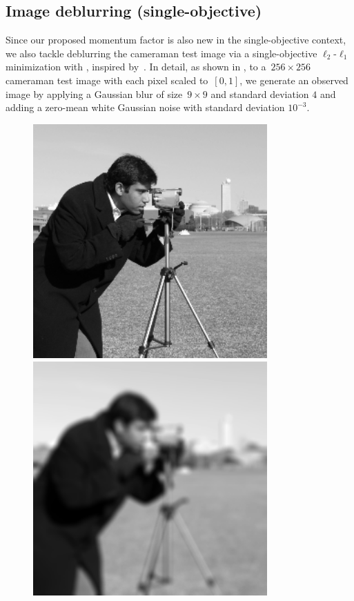 \documentclass[../main]{subfiles}
\begin{document}
\subsection{Image deblurring (single-objective)}
Since our proposed momentum factor is also new in the single-objective context, we also tackle deblurring the cameraman test image via a single-objective $\ell_2$-$\ell_1$ minimization with , inspired by~\cite{Beck2009}.
In detail, as shown in , to a~$256 \times 256$ cameraman test image with each pixel scaled to~$[0,1]$, we generate an observed image by applying a Gaussian blur of size~$9 \times 9$ and standard deviation $4$ and adding a zero-mean white Gaussian noise with standard deviation $10^{-3}$.
\begin{figure}[htpb]
    \centering
    \begin{minipage}[b]{.45\hsize}
        \centering
        \includegraphics[width=0.8\textwidth]{figs/cameraman_original.png}
    \end{minipage}
    \begin{minipage}[b]{.45\hsize}
        \centering
        \includegraphics[width=0.8\textwidth]{figs/cameraman_blurred_and_noisy.png}

\end{minipage}
\end{figure}
\end{document}
